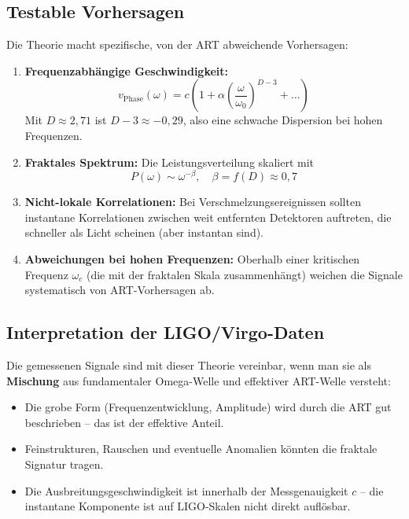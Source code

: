 \documentclass[12pt,a4paper]{article}
\begin{document}
\subsection{Testable Vorhersagen}

Die Theorie macht spezifische, von der ART abweichende Vorhersagen:

\begin{enumerate}
    \item \textbf{Frequenzabhängige Geschwindigkeit:} 
    \begin{equation}
    v_{\text{Phase}}(\omega) = c \left(1 + \alpha \left(\frac{\omega}{\omega_0}\right)^{D-3} + \dots \right)
    \end{equation}
    Mit $D \approx 2,71$ ist $D-3 \approx -0,29$, also eine schwache Dispersion bei hohen Frequenzen.
    
    \item \textbf{Fraktales Spektrum:} Die Leistungsverteilung skaliert mit
    \begin{equation}
    P(\omega) \sim \omega^{-\beta}, \quad \beta = f(D) \approx 0,7
    \end{equation}
    
    \item \textbf{Nicht-lokale Korrelationen:} Bei Verschmelzungsereignissen sollten instantane Korrelationen zwischen weit entfernten Detektoren auftreten, die schneller als Licht scheinen (aber instantan sind).
    
    \item \textbf{Abweichungen bei hohen Frequenzen:} Oberhalb einer kritischen Frequenz $\omega_c$ (die mit der fraktalen Skala zusammenhängt) weichen die Signale systematisch von ART-Vorhersagen ab.
\end{enumerate}

\subsection{Interpretation der LIGO/Virgo-Daten}

Die gemessenen Signale sind mit dieser Theorie vereinbar, wenn man sie als \textbf{Mischung} aus fundamentaler Omega-Welle und effektiver ART-Welle versteht:

\begin{itemize}
    \item Die grobe Form (Frequenzentwicklung, Amplitude) wird durch die ART gut beschrieben – das ist der effektive Anteil.
    \item Feinstrukturen, Rauschen und eventuelle Anomalien könnten die fraktale Signatur tragen.
    \item Die Ausbreitungsgeschwindigkeit ist innerhalb der Messgenauigkeit $c$ – die instantane Komponente ist auf LIGO-Skalen nicht direkt auflösbar.
\end{itemize}
\end{document}
